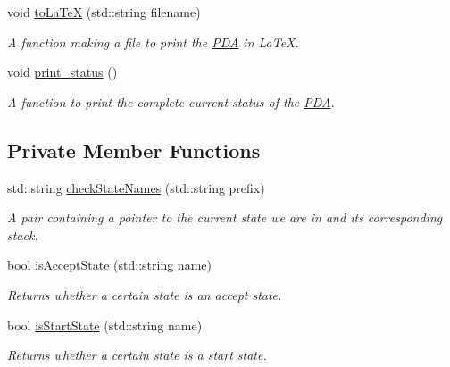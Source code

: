 \begin{DoxyCompactItemize}
void \hyperlink{classPDA_1_1PDA_a741e99b5d9e53e32d6808bf83dde96b2}{to\-La\-Te\-X} (std\-::string filename)
\begin{DoxyCompactList}\small\item\em A function making a file to print the \hyperlink{classPDA_1_1PDA}{P\-D\-A} in La\-Te\-X. \end{DoxyCompactList}\item 
void \hyperlink{classPDA_1_1PDA_a04c7164ddd8488e074741259cb9a8db4}{print\-\_\-status} ()
\begin{DoxyCompactList}\small\item\em A function to print the complete current status of the \hyperlink{classPDA_1_1PDA}{P\-D\-A}. \end{DoxyCompactList}\end{DoxyCompactItemize}
\subsection*{Private Member Functions}
\begin{DoxyCompactItemize}
\item 
std\-::string \hyperlink{classPDA_1_1PDA_af707f305d9b16dbc3dcb686a3f63fca4}{check\-State\-Names} (std\-::string prefix)
\begin{DoxyCompactList}\small\item\em A pair containing a pointer to the current state we are in and its corresponding stack. \end{DoxyCompactList}\item 
bool \hyperlink{classPDA_1_1PDA_aa245040d766419cc4e9ddcd825ab6ca5}{is\-Accept\-State} (std\-::string name)
\begin{DoxyCompactList}\small\item\em Returns whether a certain state is an accept state. \end{DoxyCompactList}\item 
bool \hyperlink{classPDA_1_1PDA_a37329b27d0ac02e944d1160a4462fbce}{is\-Start\-State} (std\-::string name)
\begin{DoxyCompactList}\small\item\em Returns whether a certain state is a start state. \end{DoxyCompactList}\end{DoxyCompactItemize}
